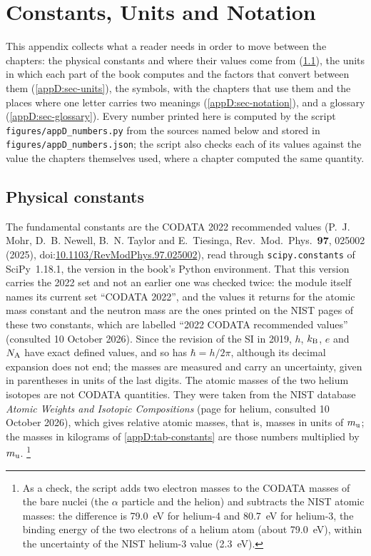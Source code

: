 \chapter{Constants, Units and Notation}\label{appD}

\noindent This appendix collects what a reader needs in order to move between the chapters: the physical constants and where their values come from (\cref{appD:sec-constants}), the units in which each part of the book computes and the factors that convert between them (\cref{appD:sec-units}), the symbols, with the chapters that use them and the places where one letter carries two meanings (\cref{appD:sec-notation}), and a glossary (\cref{appD:sec-glossary}).
Every number printed here is computed by the script \texttt{figures/\allowbreak{}appD\_\allowbreak{}numbers.\allowbreak{}py} from the sources named below and stored in \texttt{figures/\allowbreak{}appD\_\allowbreak{}numbers.\allowbreak{}json}; the script also checks each of its values against the value the chapters themselves used, where a chapter computed the same quantity.

\section{Physical constants}\label{appD:sec-constants}

The fundamental constants are the CODATA 2022 recommended values (P.~J. Mohr, D.~B. Newell, B.~N. Taylor and E.~Tiesinga, Rev.\ Mod.\ Phys.\ \textbf{97}, 025002 (2025), doi:\href{https://doi.org/10.1103/RevModPhys.97.025002}{10.1103/RevModPhys.97.025002}), read through \texttt{scipy.constants} of SciPy~1.18.1, the version in the book's Python environment.
That this version carries the 2022 set and not an earlier one was checked twice: the module itself names its current set ``CODATA 2022'', and the values it returns for the atomic mass constant and the neutron mass are the ones printed on the NIST pages of these two constants, which are labelled ``2022 CODATA recommended values'' (consulted 10 October 2026).
Since the revision of the SI in 2019, $h$, $k_{\rm B}$, $e$ and $N_{\rm A}$ have exact defined values, and so has $\hbar=h/2\pi$, although its decimal expansion does not end; the masses are measured and carry an uncertainty, given in parentheses in units of the last digits.
The atomic masses of the two helium isotopes are not CODATA quantities.
They were taken from the NIST database \emph{Atomic Weights and Isotopic Compositions} (page for helium, consulted 10 October 2026), which gives relative atomic masses, that is, masses in units of $m_{\rm u}$; the masses in kilograms of \cref{appD:tab-constants} are those numbers multiplied by $m_{\rm u}$.%
\footnote{As a check, the script adds two electron masses to the CODATA masses of the bare nuclei (the $\alpha$ particle and the helion) and subtracts the NIST atomic masses: the difference is \num{79.0}~eV for helium-4 and \num{80.7}~eV for helium-3, the binding energy of the two electrons of a helium atom (about \num{79.0}~eV), within the uncertainty of the NIST helium-3 value (\num{2.3}~eV).}

